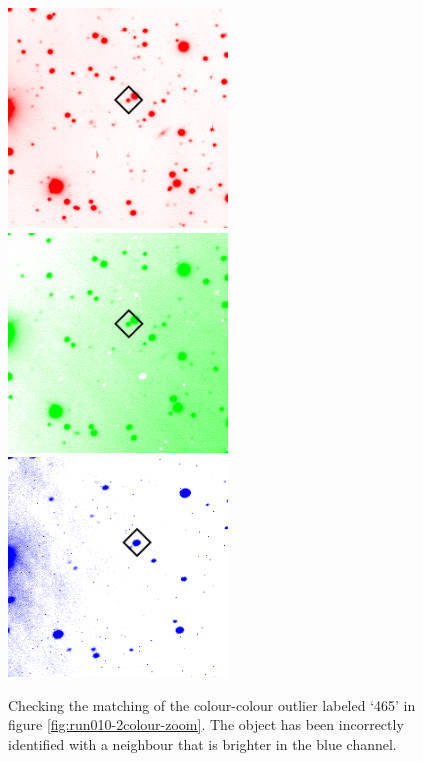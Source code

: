 \begin{figure}
  \centering
  \includegraphics[width=.30\linewidth]{images/mismatch-run010_r.png}
  \includegraphics[width=.30\linewidth]{images/mismatch-run010_g.png}
  \includegraphics[width=.30\linewidth]{images/mismatch-run010_b.png}
  \caption{Checking the matching of the colour-colour outlier labeled `465' in figure \ref{fig:run010-2colour-zoom}. The object has been incorrectly identified with a neighbour that is brighter in the blue channel.}
\label{fig:comparewebmismatch}
\end{figure}

